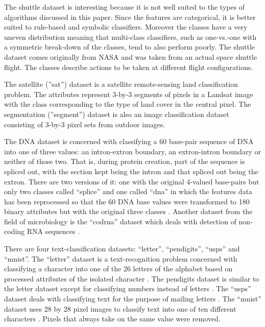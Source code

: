 \documentclass[11pt]{article}
\begin{document}
The shuttle dataset is interesting because it is not well suited to the types
of algorithms discussed in this paper. Since the features are categorical,
it is better suited to rule-based and symbolic classifiers.
Moreover the classes have a very uneven distribution meaning that multi-class
classifiers, such as one-vs.-one with a symmetric break-down of the classes, 
tend to also perform poorly.
The shuttle dataset comes originally
from NASA and was taken from an actual space shuttle flight.
The classes describe actions to be taken at different flight configurations.

The satellite (''sat'') dataset is a satellite remote-sensing land classification problem.
The attributes represent 3-by-3 segments of pixels in a Landsat 
image with the class corresponding to the type of land cover in the central pixel.
The segmentation (''segment'') dataset is also an image classification dataset consisting of 3-by-3
pixel sets from outdoor images.

The DNA dataset is concerned with classifying a 60 base-pair sequence of DNA into
one of three values: an intron-extron boundary, an extron-intron boundary or
neither of those two.
That is, during protein creation, part of the sequence is spliced out, with
the section kept being the intron and that spliced out being the extron.
There are two versions of it: one with the original 4-valued base-pairs but
only two classes called
``splice'' and one called ``dna'' in which
the features data has been reprocessed so that
the 60 DNA base values were transformed to 180 binary attributes but with the
original three classes \citep{Michie_etal1994}.
Another dataset from the field of microbiology is the ``codrna'' dataset
which deals with detection of non-coding RNA sequences
\citep{Uzilov_etal2006}.

There are four text-classification datasets: ``letter'', ``pendigits'',
``usps'' and ``mnist''.
The ``letter'' dataset is a text-recognition problem concerned with classifying
a character into one of the 26 letters of the alphabet based on processed
attributes of the isolated character \citep{Frey_Slate1991}.
The pendigits dataset is similar to the letter dataset except for
classifying numbers instead of letters \citep{Alimoglu1996}.
The ``usps'' dataset deals with classifying text for the purpose of mailing
letters \citep{Hull1994}.
The ``mnist'' dataset uses 28 by 28 pixel images to classify text into one
of ten different characters \citep{LeCun_etal1998}. 
Pixels that always take on the same value were removed.
\end{document}
